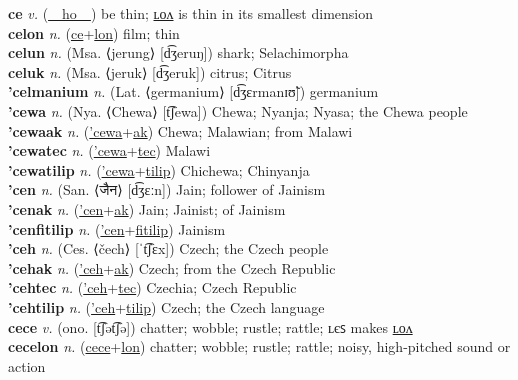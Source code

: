 \textbf{ce} \textit{v.} (\hyperref[ho]{~~ho~~})
be thin; \hyperref[celon]{ʟᴏᴧ} is thin in its smallest dimension \label{ce} \\
\textbf{celon} \textit{n.} (\hyperref[ce]{ce}+\hyperref[lon]{lon})
film; thin \label{celon} \\
\textbf{celun} \textit{n.} (Msa. ⟨jerung⟩ [d͡ʒeruŋ])
shark; Selachimorpha \label{celun} \\
\textbf{celuk} \textit{n.} (Msa. ⟨jeruk⟩ [d͡ʒeruk])
citrus; Citrus \label{celuk} \\
\textbf{'celmanium} \textit{n.} (Lat. ⟨germanium⟩ [d͡ʒɛrmanɪʊ̃])
germanium \label{'celmanium} \\
\textbf{'cewa} \textit{n.} (Nya. ⟨Chewa⟩ [t͡ʃewa])
Chewa; Nyanja; Nyasa; the Chewa people \label{'cewa} \\
\textbf{'cewaak} \textit{n.} (\hyperref['cewa]{'cewa}+\hyperref[ak]{ak})
Chewa; Malawian; from Malawi \label{'cewaak} \\
\textbf{'cewatec} \textit{n.} (\hyperref['cewa]{'cewa}+\hyperref[tec]{tec})
Malawi \label{'cewatec} \\
\textbf{'cewatilip} \textit{n.} (\hyperref['cewa]{'cewa}+\hyperref[tilip]{tilip})
Chichewa; Chinyanja \label{'cewatilip} \\
\textbf{'cen} \textit{n.} (San. ⟨जैन⟩ [d͡ʒɛːn])
Jain; follower of Jainism \label{'cen} \\
\textbf{'cenak} \textit{n.} (\hyperref['cen]{'cen}+\hyperref[ak]{ak})
Jain; Jainist; of Jainism \label{'cenak} \\
\textbf{'cenfitilip} \textit{n.} (\hyperref['cen]{'cen}+\hyperref[fitilip]{fitilip})
Jainism \label{'cenfitilip} \\
\textbf{'ceh} \textit{n.} (Ces. ⟨čech⟩ [ˈt͡ʃɛx])
Czech; the Czech people \label{'ceh} \\
\textbf{'cehak} \textit{n.} (\hyperref['ceh]{'ceh}+\hyperref[ak]{ak})
Czech; from the Czech Republic \label{'cehak} \\
\textbf{'cehtec} \textit{n.} (\hyperref['ceh]{'ceh}+\hyperref[tec]{tec})
Czechia; Czech Republic \label{'cehtec} \\
\textbf{'cehtilip} \textit{n.} (\hyperref['ceh]{'ceh}+\hyperref[tilip]{tilip})
Czech; the Czech language \label{'cehtilip} \\
\textbf{cece} \textit{v.} (ono. [t͡ʃət͡ʃə])
chatter; wobble; rustle; rattle; ʟєꜱ makes \hyperref[cecelon]{ʟᴏᴧ} \label{cece} \\
\textbf{cecelon} \textit{n.} (\hyperref[cece]{cece}+\hyperref[lon]{lon})
chatter; wobble; rustle; rattle; noisy, high-pitched sound or action \label{cecelon} \\

